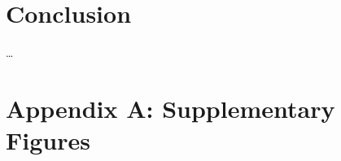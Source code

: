 \documentclass[11pt]{article}
\begin{document}
\section*{Conclusion}

\ldots




\newpage{}

\section*{Appendix A: Supplementary Figures}

%
%
%
%
%
\end{document}
